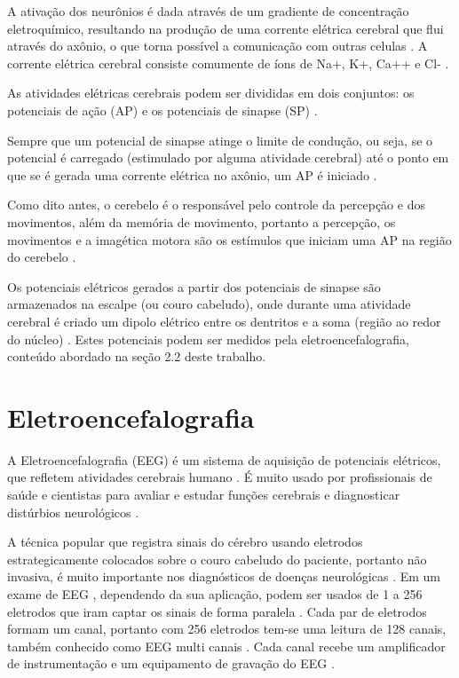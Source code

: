 A ativação dos neurônios é dada através de um gradiente de concentração eletroquímico, resultando na produção de uma corrente elétrica cerebral que flui através do axônio, o que torna possível a comunicação com outras celulas \cite{SIULYDissertacao}. A corrente elétrica cerebral consiste comumente de íons de Na+, K+, Ca++ e Cl- \cite{EEGSignals}.

As atividades elétricas cerebrais podem ser divididas em dois conjuntos: os potenciais de ação (AP) e os potenciais de sinapse (SP) \cite{SIULYDissertacao}.

Sempre que um potencial de sinapse atinge o limite de condução, ou seja, se o potencial é carregado (estimulado por alguma atividade cerebral) até o ponto em que se é gerada uma corrente elétrica no axônio, um AP é iniciado \cite{SIULYDissertacao}.

Como dito antes, o cerebelo é o responsável pelo controle da percepção e dos movimentos, além da memória de movimento, portanto a percepção, os movimentos e a imagética motora são os estímulos que iniciam uma AP na região do cerebelo \cite{alvarezneurobiomecanismos}.

Os potenciais elétricos gerados a partir dos potenciais de sinapse são armazenados na escalpe (ou couro cabeludo), onde durante uma atividade cerebral é criado um dipolo elétrico entre os dentritos e a soma (região ao redor do núcleo) \cite{SIULYDissertacao}. Estes potenciais podem ser medidos pela eletroencefalografia, conteúdo abordado na seção 2.2 deste trabalho.

\section{Eletroencefalografia}

A Eletroencefalografia (EEG) é um sistema de aquisição de potenciais elétricos, que refletem atividades cerebrais humano \cite{Siulybook}. É muito usado por profissionais de saúde e cientistas para avaliar e estudar funções cerebrais e diagnosticar distúrbios neurológicos \cite{Siulybook}.

A técnica popular que registra sinais do cérebro usando eletrodos estrategicamente colocados sobre o couro cabeludo do paciente, portanto não invasiva, é muito importante nos diagnósticos de doenças neurológicas \cite{raobrain}. Em um exame de EEG , dependendo da sua aplicação, podem ser usados de 1 a 256 eletrodos que iram captar os sinais de forma paralela \cite{raobrain}. Cada par de eletrodos formam um canal, portanto com 256 eletrodos tem-se uma leitura de 128 canais, também conhecido como EEG multi canais \cite{raobrain}. Cada canal recebe um amplificador de instrumentação e um equipamento de gravação do EEG \cite{raobrain}.

